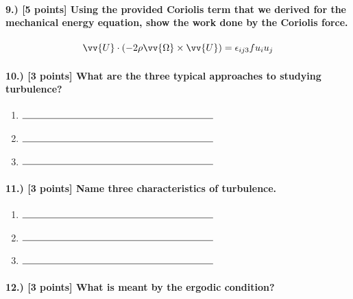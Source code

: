 \documentclass[11pt]{article}
\begin{document}
\paragraph{9.) [5 points] Using the provided Coriolis term that we derived for the mechanical energy equation, show the work done by the Coriolis force.}

$$\vv{U} \cdot \left(-2\rho \vv{\Omega} \times \vv{U} \right) = \epsilon_{ij3}fu_iu_j$$
\vspace{150pt}

\paragraph{10.) [3 points] What are the three typical approaches to studying turbulence?}
\begin{enumerate}[label=\alph*.)]
\item $\rule{7cm}{0.15mm}$
\vspace{10pt}
\item $\rule{7cm}{0.15mm}$
\vspace{10pt}
\item $\rule{7cm}{0.15mm}$
\end{enumerate}

\paragraph{11.) [3 points] Name three characteristics of turbulence.}
\begin{enumerate}[label=\alph*.)]
\item $\rule{7cm}{0.15mm}$
\vspace{10pt}
\item $\rule{7cm}{0.15mm}$
\vspace{10pt}
\item $\rule{7cm}{0.15mm}$
\end{enumerate}

\paragraph{12.) [3 points] What is meant by the ergodic condition?}~\\
\newpage

\end{document}
